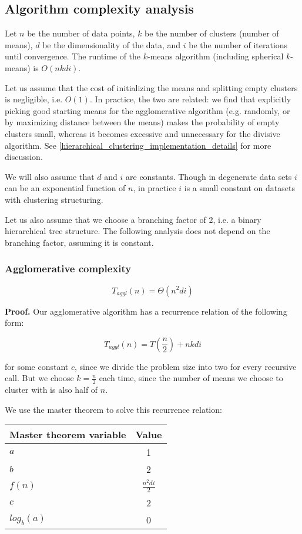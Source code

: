\documentclass[../tech_report_1.tex]{subfiles}
\begin{document}
\subsection{Algorithm complexity analysis}

Let $n$ be the number of data points, $k$ be the number of clusters (number of means), $d$ be the dimensionality of the data, and $i$ be the number of iterations until convergence. The runtime of the $k$-means algorithm (including spherical $k$-means) is $O(nkdi)$.

Let us assume that the cost of initializing the means and splitting empty clusters is negligible, i.e. $O(1)$. In practice, the two are related: we find that explicitly picking good starting means for the agglomerative algorithm (e.g. randomly, or by maximizing distance between the means) makes the probability of empty clusters small, whereas it becomes excessive and unnecessary for the divisive algorithm. See \ref{hierarchical_clustering_implementation_details} for more discussion.

We will also assume that $d$ and $i$ are constants. Though in degenerate data sets $i$ can be an exponential function of $n$, in practice $i$ is a small constant on datasets with clustering structuring.

Let us also assume that we choose a branching factor of 2, i.e. a binary hierarchical tree structure. The following analysis does not depend on the branching factor, assuming it is constant.

\subsubsection{Agglomerative complexity}

\begin{theorem} $$T_{aggl}(n) = \Theta(n^2di)$$ \end{theorem}

\textbf{Proof.} Our agglomerative algorithm has a recurrence relation of the following form:

$$ T_{aggl}(n) = T(\frac{n}{2}) + nkdi $$

for some constant $c$, since we divide the problem size into two for every recursive call. But we choose $k=\frac{n}{2}$ each time, since the number of means we choose to cluster with is also half of $n$.

We use the master theorem  \cite{thomas2001introduction} to solve this recurrence relation:

\begin{table}[ht]
\centering
\begin{tabular}{l || c }
\hline
\textbf{Master theorem variable} & \textbf{Value} \\
\hline
$a$ & 1 \\
$b$ & 2 \\
$f(n)$ & $\frac{n^2di}{2}$ \\
$c$ & 2 \\
$log_b(a)$ & 0 \\
\hline
\end{tabular}
\end{table}
\end{document}
